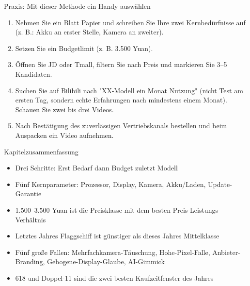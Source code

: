 \begin{tcbpractice}{Praxis: Mit dieser Methode ein Handy auswählen}
\begin{enumerate}
  \item Nehmen Sie ein Blatt Papier und schreiben Sie Ihre zwei Kernbedürfnisse auf (z. B.: Akku an erster Stelle, Kamera an zweiter).
  \item Setzen Sie ein Budgetlimit (z. B. 3.500 Yuan).
  \item Öffnen Sie JD oder Tmall, filtern Sie nach Preis und markieren Sie 3–5 Kandidaten.
  \item Suchen Sie auf Bilibili nach "XX-Modell ein Monat Nutzung" (nicht Test am ersten Tag, sondern echte Erfahrungen nach mindestens einem Monat). Schauen Sie zwei bis drei Videos.
  \item Nach Bestätigung des zuverlässigen Vertriebskanals bestellen und beim Auspacken ein Video aufnehmen.
\end{enumerate}

\end{tcbpractice}

\begin{tcbsummary}{Kapitelzusammenfassung}
\begin{itemize}
  \item Drei Schritte: Erst Bedarf dann Budget zuletzt Modell
  \item Fünf Kernparameter: Prozessor, Display, Kamera, Akku/Laden, Update-Garantie
  \item 1.500–3.500 Yuan ist die Preisklasse mit dem besten Preis-Leistungs-Verhältnis
  \item Letztes Jahres Flaggschiff ist günstiger als dieses Jahres Mittelklasse
  \item Fünf große Fallen: Mehrfachkamera-Täuschung, Hohe-Pixel-Falle, Anbieter-Branding, Gebogene-Display-Glaube, AI-Gimmick
  \item 618 und Doppel-11 sind die zwei besten Kaufzeitfenster des Jahres
\end{itemize}

\end{tcbsummary}
